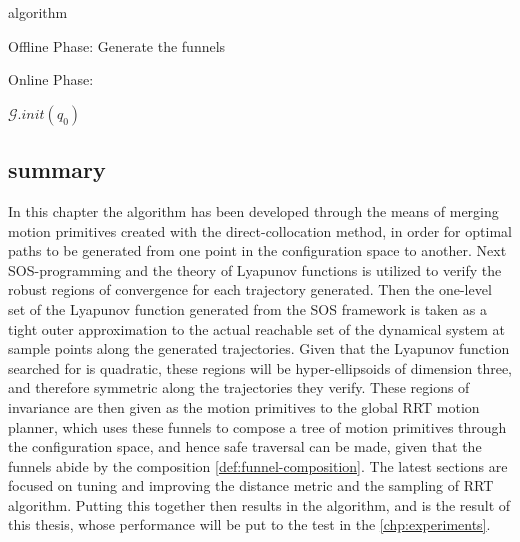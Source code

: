 \begin{algorithm}[H]
  \caption{\rrtfunnel{} algorithm}
  \label{alg:rrtfunnel}
  \DontPrintSemicolon

   

   

  Offline Phase: Generate the funnels

  Online Phase:

  \TestUncertainFunnels{} \; \BuildComposabilityMatrix{}

  \(\mathcal{G}.init(q_0)\) 
\end{algorithm}


\subsection{summary}

In this chapter the \rrtfunnel{} algorithm has been developed through the means
of merging motion primitives created with the direct-collocation method, in
order for optimal paths to be generated from one point in the configuration
space to another. Next \ac{SOS}-programming and the theory of Lyapunov functions
is utilized to verify the robust regions of convergence for each trajectory
generated. Then the one-level set of the Lyapunov function generated from the
\ac{SOS} framework is taken as a tight outer approximation to the actual
reachable set of the dynamical system at sample points along the generated
trajectories. Given that the Lyapunov function searched for is quadratic, these
regions will be hyper-ellipsoids of dimension three, and therefore symmetric
along the trajectories they verify. These regions of invariance are then given
as the motion primitives to the global \ac{RRT} motion planner, which uses these
funnels to compose a tree of motion primitives through the configuration space,
and hence safe traversal can be made, given that the funnels abide by the
composition \cref{def:funnel-composition}. The latest sections are focused on
tuning and improving the distance metric and the sampling of \ac{RRT} algorithm.
Putting this together then results in the \rrtfunnel{} algorithm, and is the
result of this thesis, whose performance will be put to the test in the
\cref{chp:experiments}.
